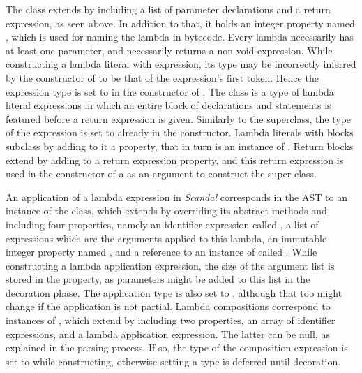 The  class extends  by including a list of parameter declarations and a return expression, as seen above. In addition to that, it holds an integer property named , which is used for naming the lambda in bytecode. Every lambda necessarily has at least one parameter, and necessarily returns a non-void expression. While constructing a lambda literal with expression, its type may be incorrectly inferred by the constructor of  to be that of the expression's first token. Hence the expression type is set to  in the constructor of . The  class is a type of lambda literal expressions in which an entire block of declarations and statements is featured before a return expression is given. Similarly to the superclass, the type of the expression is set to  already in the constructor. Lambda literals with blocks subclass  by adding to it a  property, that in turn is an instance of . Return blocks extend  by adding to  a return expression property, and this return expression is used in the constructor of a  as an argument to construct the  super class.

An application of a lambda expression in \emph{Scandal} corresponds in the AST to an instance of the  class, which extends  by overriding its abstract methods and including four properties, namely an identifier expression called , a list of expressions which are the arguments applied to this lambda, an immutable integer property named , and a reference to an instance of  called . While constructing a lambda application expression, the size of the argument list is stored in the  property, as parameters might be added to this list in the decoration phase. The application type is also set to , although that too might change if the application is not partial. Lambda compositions correspond to instances of , which extend  by including two properties, an array of identifier expressions, and a lambda application expression. The latter can be null, as explained in the parsing process. If so, the type of the composition expression is set to  while constructing, otherwise setting a type is deferred until decoration.
